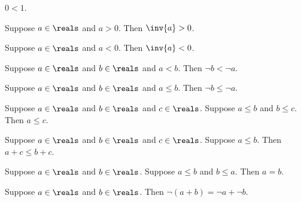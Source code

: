 \begin{proposition}\label{real_zero_lt_one}
    $0 < 1$.
\end{proposition}

\begin{proposition}\label{real_inv_pos}
    Suppose $a\in\reals$ and $a > 0$.
    Then $\inv{a} > 0$.
\end{proposition}

\begin{proposition}\label{real_inv_neg}
    Suppose $a\in\reals$ and $a < 0$.
    Then $\inv{a} < 0$.
\end{proposition}

\begin{proposition}\label{real_lt_neg}
    Suppose $a\in\reals$ and $b\in\reals$ and $a < b$.
    Then $\neg{b} < \neg{a}$.
\end{proposition}

\begin{lemma}\label{real_leq_neg}
    Suppose $a\in\reals$ and $b\in\reals$ and $a \leq b$.
    Then $\neg{b} \leq \neg{a}$.
\end{lemma}

\begin{lemma}\label{real_leq_trans}
    Suppose $a\in\reals$ and $b\in\reals$ and $c\in\reals$.
    Suppose $a \leq b$ and $b \leq c$.
    Then $a \leq c$.
\end{lemma}

\begin{lemma}\label{real_leq_add}
    Suppose $a\in\reals$ and $b\in\reals$ and $c\in\reals$.
    Suppose $a \leq b$.
    Then $a + c \leq b + c$.
\end{lemma}

\begin{lemma}\label{real_leq_antisym}
    Suppose $a\in\reals$ and $b\in\reals$.
    Suppose $a \leq b$ and $b \leq a$.
    Then $a = b$.
\end{lemma}

\begin{lemma}\label{real_neg_addition}
    Suppose $a\in\reals$ and $b\in\reals$.
    Then $\neg{(a + b)} = \neg{a} + \neg{b}$.
\end{lemma}

